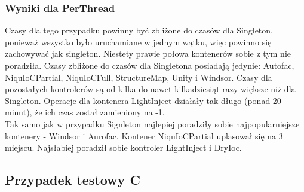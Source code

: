 \documentclass[12pt]{article}
\begin{document}
\subsubsection{Wyniki dla PerThread}
Czasy dla tego przypadku powinny być zbliżone do czasów dla Singleton, ponieważ wszystko było uruchamiane w jednym wątku, więc powinno się zachowywać jak singleton. Niestety prawie połowa kontenerów sobie z tym nie poradziła. Czasy zbliżone do czasów dla Singletona posiadają jedynie: Autofac, NiquIoCPartial, NiquIoCFull, StructureMap, Unity i Windsor. Czasy dla pozostałych kontrolerów są od kilka do nawet kilkadziesiąt razy większe niż dla Singleton. Operacje dla kontenera LightInject działały tak długo (ponad 20 minut), że ich czas został zamieniony na -1.\\
Tak samo jak w przypadku Signleton najlepiej poradziły sobie najpopularniejsze kontenery - Windsor i Aurofac. Kontener NiquIoCPartial uplasował się na 3 miejscu. Najsłabiej poradził sobie kontroler LightInject i DryIoc.


\subsection{Przypadek testowy C}
\end{document}
